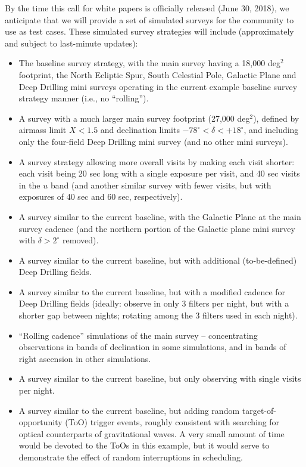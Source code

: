 \documentclass[DM,lsstdraft,toc,usenatbib]{lsstdoc}
\begin{document}
By the time this call for white papers is officially released (June 30, 2018), we anticipate that we will provide a set of
simulated surveys for the community to use as test cases. These simulated survey strategies will include (approximately
and subject to last-minute updates): 
\begin{itemize}
\item The baseline survey strategy, with the main survey having a 18,000 deg$^2$ footprint, the North Ecliptic Spur, South Celestial Pole, Galactic Plane and Deep Drilling mini surveys operating in the current example baseline survey strategy manner (i.e., no ``rolling''). 
\item A survey with a much larger main survey footprint (27,000 deg$^2$), defined by airmass limit $X<1.5$ and declination limits 
$-78^\circ< \delta < +18^\circ$, and including only the four-field Deep Drilling mini survey (and no other mini surveys).
\item A survey strategy allowing more overall visits by making each visit shorter: each visit being 20 sec long with a single exposure per visit, and 40 sec visits in the $u$ band (and another similar survey with fewer visits, but with exposures of 40 sec and 60 sec, respectively). 
\item A survey similar to the current baseline, with the Galactic Plane at the main survey cadence (and the northern portion of the Galactic plane mini survey with $\delta>2^\circ$ removed).
\item A survey similar to the current baseline, but with additional (to-be-defined) Deep Drilling fields.
\item A survey similar to the current baseline, but with a modified cadence for Deep Drilling fields (ideally: observe in only 3 filters per night, but with a shorter gap between nights; rotating among the 3 filters used in each night).
\item ``Rolling cadence'' simulations of the main survey -- concentrating observations in bands of declination in some simulations, and in bands of 
right ascension  in other simulations. 
\item A survey similar to the current baseline, but only observing with single visits per night.
\item A survey similar to the current baseline, but adding random target-of-opportunity (ToO) trigger events, roughly consistent with searching for optical counterparts
of gravitational waves. A very small amount of time would be devoted to the ToOs in this example, but it would serve to demonstrate the effect of random interruptions
in scheduling. 
\end{itemize}
\end{document}

